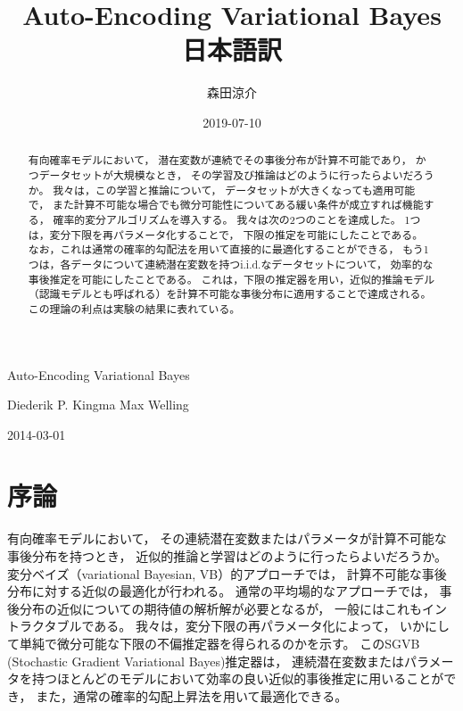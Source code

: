 \documentclass[dvipdfmx, fleqn]{jsarticle}
\title{Auto-Encoding Variational Bayes 日本語訳}
\date{2019-07-10}
\author{
    森田涼介
    }
\begin{document}
\maketitle

\vspace{\baselineskip}
\begin{center}
\Large
    Auto-Encoding Variational Bayes

\large
\vspace{\baselineskip}
    Diederik P. Kingma
    \qquad
    Max Welling
 
\vspace{\baselineskip}
    2014-03-01
\end{center}
\vspace{2\baselineskip}


\begin{abstract}
    有向確率モデルにおいて，
    潜在変数が連続でその事後分布が計算不可能であり，
    かつデータセットが大規模なとき，
    その学習及び推論はどのように行ったらよいだろうか。
    我々は，この学習と推論について，
    データセットが大きくなっても適用可能で，
    また計算不可能な場合でも微分可能性についてある緩い条件が成立すれば機能する，
    確率的変分アルゴリズムを導入する。
    我々は次の2つのことを達成した。
    1つは，変分下限を再パラメータ化することで，
    下限の推定を可能にしたことである。
    なお，これは通常の確率的勾配法を用いて直接的に最適化することができる，
    もう1つは，各データについて連続潜在変数を持つi.i.d.なデータセットについて，
    効率的な事後推定を可能にしたことである。
    これは，下限の推定器を用い，近似的推論モデル（認識モデルとも呼ばれる）を計算不可能な事後分布に適用することで達成される。
    この理論の利点は実験の結果に表れている。
\end{abstract}



\section{序論}

有向確率モデルにおいて，
その連続潜在変数またはパラメータが計算不可能な事後分布を持つとき，
近似的推論と学習はどのように行ったらよいだろうか。
変分ベイズ（variational Bayesian, VB）的アプローチでは，
計算不可能な事後分布に対する近似の最適化が行われる。
通常の平均場的なアプローチでは，
事後分布の近似についての期待値の解析解が必要となるが，
一般にはこれもイントラクタブルである。
我々は，変分下限の再パラメータ化によって，
いかにして単純で微分可能な下限の不偏推定器を得られるのかを示す。
このSGVB (Stochastic Gradient Variational Bayes)推定器は，
連続潜在変数またはパラメータを持つほとんどのモデルにおいて効率の良い近似的事後推定に用いることができ，
また，通常の確率的勾配上昇法を用いて最適化できる。
\end{document}
